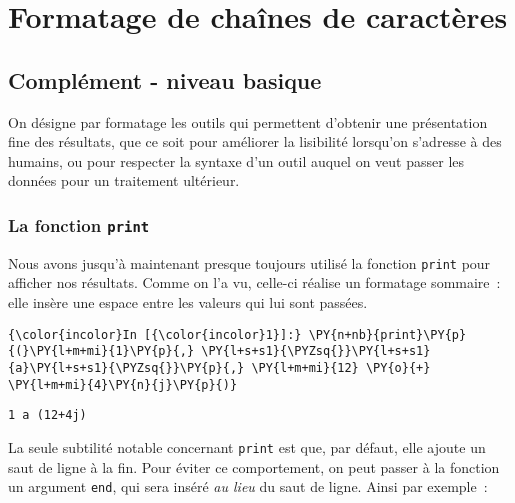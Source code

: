     \hypertarget{formatage-de-chauxeenes-de-caractuxe8res}{%
\section{Formatage de chaînes de
caractères}\label{formatage-de-chauxeenes-de-caractuxe8res}}

    \hypertarget{compluxe9ment---niveau-basique}{%
\subsection{Complément - niveau
basique}\label{compluxe9ment---niveau-basique}}

    On désigne par formatage les outils qui permettent d'obtenir une
présentation fine des résultats, que ce soit pour améliorer la
lisibilité lorsqu'on s'adresse à des humains, ou pour respecter la
syntaxe d'un outil auquel on veut passer les données pour un traitement
ultérieur.

    \hypertarget{la-fonction-print}{%
\subsubsection{\texorpdfstring{La fonction
\texttt{print}}{La fonction print}}\label{la-fonction-print}}

    Nous avons jusqu'à maintenant presque toujours utilisé la fonction
\texttt{print} pour afficher nos résultats. Comme on l'a vu, celle-ci
réalise un formatage sommaire~: elle insère une espace entre les valeurs
qui lui sont passées.

    \begin{Verbatim}[commandchars=\\\{\}]
{\color{incolor}In [{\color{incolor}1}]:} \PY{n+nb}{print}\PY{p}{(}\PY{l+m+mi}{1}\PY{p}{,} \PY{l+s+s1}{\PYZsq{}}\PY{l+s+s1}{a}\PY{l+s+s1}{\PYZsq{}}\PY{p}{,} \PY{l+m+mi}{12} \PY{o}{+} \PY{l+m+mi}{4}\PY{n}{j}\PY{p}{)}
\end{Verbatim}


    \begin{Verbatim}[commandchars=\\\{\}]
1 a (12+4j)

    \end{Verbatim}

    La seule subtilité notable concernant \texttt{print} est que, par
défaut, elle ajoute un saut de ligne à la fin. Pour éviter ce
comportement, on peut passer à la fonction un argument \texttt{end}, qui
sera inséré \emph{au lieu} du saut de ligne. Ainsi par exemple~:

